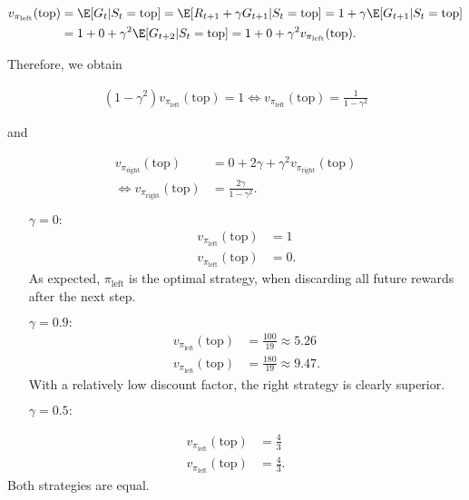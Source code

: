 \begin{solution}

\begin{align*}
  v_{\pi_{\text{left}}}(\text{top}) &= \E[G_t | S_t = \text{top}] = \E[R_{t+1} + \gamma G_{t+1} | S_t = \text{top}]
  = 1 + \gamma\E[G_{t+1} | S_t = \text{top}] \\
  &= 1 + 0 + \gamma^2 \E[G_{t+2} | S_t = \text{top}]
  = 1 + 0 + \gamma^2 v_{\pi_{\text{left}}}(\text{top}).
\end{align*}

Therefore, we obtain

\begin{align*}
  (1 - \gamma^2)v_{\pi_{\text{left}}}(\text{top}) = 1
  \iff v_{\pi_{\text{left}}}(\text{top}) = \frac{1}{1 - \gamma^2}
\end{align*}

and

\begin{align*}
  v_{\pi_{\text{right}}}(\text{top}) &= 0 + 2\gamma + \gamma^2v_{\pi_{\text{right}}}(\text{top}) \\
  \iff v_{\pi_{\text{right}}}(\text{top}) &= \frac{2\gamma}{1 - \gamma^2}.
\end{align*}

\begin{itemize}
  \item[$\gamma = 0:$]
  \begin{align*}
    v_{\pi_{\text{left}}}(\text{top}) &= 1 \\
    v_{\pi_{\text{left}}}(\text{top}) &= 0.
  \end{align*}
  As expected, $\pi_{\text{left}}$ is the optimal strategy, when discarding all
  future rewards after the next step.
  \item[$\gamma = 0.9:$]
  \begin{align*}
    v_{\pi_{\text{left}}}(\text{top}) &= \frac{100}{19} \approx 5.26 \\
    v_{\pi_{\text{left}}}(\text{top}) &= \frac{180}{19} \approx 9.47.
  \end{align*}
  With a relatively low discount factor, the right strategy is clearly superior.
  \item[$\gamma = 0.5:$]
\end{itemize}
\begin{align*}
  v_{\pi_{\text{left}}}(\text{top}) &= \frac{4}{3} \\
  v_{\pi_{\text{left}}}(\text{top}) &= \frac{4}{3}.
\end{align*}
Both strategies are equal.

\end{solution}


